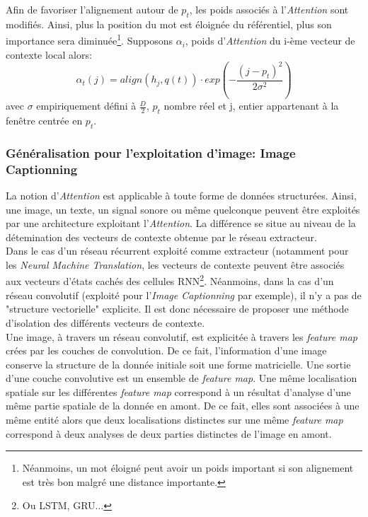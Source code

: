 \noindent Afin de favoriser l'alignement autour de $p_t$, les poids associés à l'\textit{Attention} sont modifiés. Ainsi, plus la position du mot est éloignée du référentiel, plus son importance sera diminuée\footnote{Néanmoins, un mot éloigné peut avoir un poids important si son alignement est très bon malgré une distance importante.}. Supposons $\alpha_i$, poids d'\textit{Attention} du i-ème vecteur de contexte local alors:
$$\alpha_t(j)=align(h_j,q(t)) \cdot exp(-\frac{(j-p_t)^2}{2\sigma^2})$$ avec $\sigma$ empiriquement défini à $\frac{D}{2}$, $p_t$ nombre réel et j, entier appartenant à la fenêtre centrée en $p_t$.



\subsubsection{Généralisation pour l'exploitation d'image: Image Captionning}
La notion d'\textit{Attention} est applicable à toute forme de données structurées. Ainsi, une image, un texte, un signal sonore ou même quelconque peuvent être exploités par une architecture exploitant l'\textit{Attention}. La différence se situe au niveau de la détemination des vecteurs de contexte obtenue par le réseau extracteur.\\

\noindent Dans le cas d'un réseau récurrent exploité comme extracteur (notamment pour les \textit{Neural Machine Translation}, les vecteurs de contexte peuvent être associés aux vecteurs d'états cachés des cellules RNN\footnote{Ou LSTM, GRU...}. Néanmoins, dans la cas d'un réseau convolutif (exploité pour l'\textit{Image Captionning} par exemple), il n'y a pas de "structure vectorielle" explicite. Il est donc nécessaire de proposer une méthode d'isolation des différents vecteurs de contexte.\\

\noindent Une image, à travers un réseau convolutif, est explicitée à travers les \textit{feature map} crées par les couches de convolution. De ce fait, l'information d'une image conserve la structure de la donnée initiale soit une forme matricielle. Une sortie d'une couche convolutive est un ensemble de \textit{feature map}. Une même localisation spatiale sur les différentes \textit{feature map} correspond à un résultat d'analyse d'une même partie spatiale de la donnée en amont. De ce fait, elles sont associées à une même entité alors que deux localisations distinctes sur une même \textit{feature map} correspond à deux analyses de deux parties distinctes de l'image en amont. \\

